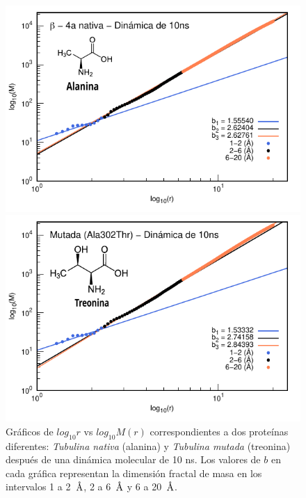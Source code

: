 	\begin{figure}[H]
		\hspace{-0.3cm} 
		\begin{minipage}{0.49\textwidth}
			\centering
			\includegraphics[width=\linewidth,page=1]{graphs/PDBs/Tubb4/TubNat10ns.pdf}
		\end{minipage}
		\hspace{0.2cm}
		\begin{minipage}{0.49\textwidth}
			\centering
			\includegraphics[width=\linewidth,page=1]{graphs/PDBs/Tubb4/TubMut10ns.pdf}
		\end{minipage}
		
		
		\caption{
			Gr\'{a}ficos de $log_{10}r$ vs $log_{10}M(r)$ correspondientes a dos prote\'{i}nas diferentes: \textit{Tubulina nativa} (alanina) y \textit{Tubulina mutada} (treonina) despu\'{e}s de una din\'{a}mica molecular de 10 ns. Los valores de $b$ en cada gr\'{a}fica representan la dimensi\'{o}n fractal de masa en los intervalos 1 a 2~$\textup{\r{A}}$, 2 a 6~$\textup{\r{A}}$ y 6 a 20~$\textup{\r{A}}$.}
		\label{fig:Tubs}
	\end{figure}
	
